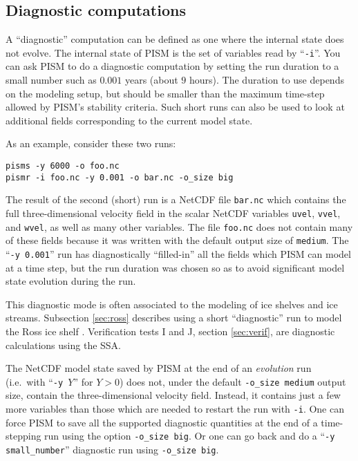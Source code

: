\subsection{Diagnostic computations}
\label{sec:diagnostic-computations}

A ``diagnostic'' computation can be defined as one where the internal state does not evolve.  The internal state of PISM is the set of variables read by ``\texttt{-i}''.  You can ask PISM to do a diagnostic computation by setting the run duration to a small number such as $0.001$ years (about $9$ hours). The duration to use depends on the modeling setup, but should be smaller than the maximum time-step allowed by PISM's stability criteria. Such short runs can also be used to look at additional fields corresponding to the current model state.

As an example, consider these two runs:
\begin{verbatim}
pisms -y 6000 -o foo.nc
pismr -i foo.nc -y 0.001 -o bar.nc -o_size big
\end{verbatim}

\noindent The result of the second (short) run is a NetCDF file \texttt{bar.nc} which contains the full three-dimensional velocity field in the scalar NetCDF variables \texttt{uvel}, \texttt{vvel}, and \texttt{wvel}, as well as many other variables.  The file \texttt{foo.nc} does not contain many of these fields because it was written with the default output size of \texttt{medium}.  The ``\texttt{-y 0.001}'' run has diagnostically ``filled-in'' all the fields which PISM can model at a time step, but the run duration was chosen so as to avoid significant model state evolution during the run.

This diagnostic mode is often associated to the modeling of ice shelves and ice streams.  Subsection \ref{sec:ross} describes using a short ``diagnostic'' run to model the Ross ice shelf \cite{MacAyealetal}.  Verification tests I and J, section \ref{sec:verif}, are diagnostic calculations using the SSA.

The NetCDF model state saved by PISM at the end of an \emph{evolution} run (i.e.~with ``\texttt{-y }$Y$'' for $Y>0$) does not, under the default \texttt{-o_size medium} output size, contain the three-dimensional velocity field.  Instead, it contains just a few more variables than those which are needed to restart the run with \texttt{-i}.  One can  force PISM to save all the supported diagnostic quantities at the end of a time-stepping run using the option \texttt{-o_size big}.  Or one can go back and do a ``\texttt{-y small_number}'' diagnostic run using \texttt{-o_size big}.


